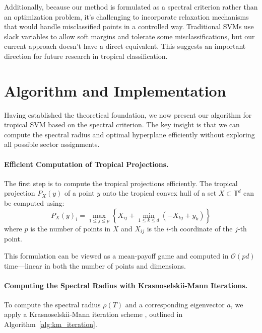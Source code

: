 \documentclass{article}
\newcommand{\trop}{\mathbb{T}}
\begin{document}
Additionally, because our method is formulated as a spectral criterion rather than an optimization problem, it's challenging to incorporate relaxation mechanisms that would handle misclassified points in a controlled way. Traditional SVMs use slack variables to allow soft margins and tolerate some misclassifications, but our current approach doesn't have a direct equivalent. This suggests an important direction for future research in tropical classification.

\section{Algorithm and Implementation}\label{sec:algorithm}

Having established the theoretical foundation, we now present our algorithm for tropical SVM based on the spectral criterion. The key insight is that we can compute the spectral radius and optimal hyperplane efficiently without exploring all possible sector assignments.

\paragraph{Efficient Computation of Tropical Projections.}
\label{subsec:computing_projections}
The first step is to compute the tropical projections efficiently. The tropical projection $P_X(y)$ of a point $y$ onto the tropical convex hull of a set $X \subset \trop^d$ can be computed using:
\[
P_X(y)_i = \max_{1 \leq j \leq p} \left\{X_{ij} + \min_{1 \leq k \leq d} \left(-X_{kj} + y_k\right)\right\}
\]
where $p$ is the number of points in $X$ and $X_{ij}$ is the $i$-th coordinate of the $j$-th point.

This formulation can be viewed as a mean-payoff game \cite{akian2020} and computed in $\mathcal{O}(pd)$ time—linear in both the number of points and dimensions.

\paragraph{Computing the Spectral Radius with Krasnoselskii-Mann Iterations.}
\label{subsec:spectral_computation}
To compute the spectral radius $\rho(T)$ and a corresponding eigenvector $a$, we apply a Krasnoselskii-Mann iteration scheme \cite{nussbaum1986, gaubert2004}, outlined in Algorithm~\ref{alg:km_iteration}.
\end{document}
